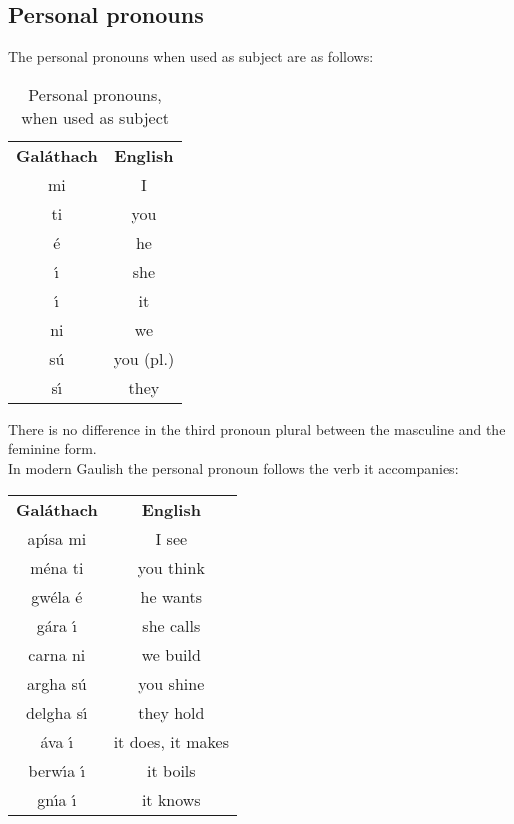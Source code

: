\subsection{Personal pronouns}

The personal pronouns when used as subject are as follows:
\begin{table}[H]
\centering
\begin{tabular}{cc}
  \toprule
  \textbf{Gal\'{a}thach} & \textbf{English}\\
  \cmidrule(lr){1-1}\cmidrule{2-2}
  mi & I \\
  ti & you\\
  \'{e} & he\\
  \'{\i} & she\\
  \'{\i} & it\\
  ni & we\\
  s\'{u} & you (pl.)\\
  s\'{\i} & they\\
  \bottomrule
\end{tabular}
\caption{Personal pronouns, when used as subject}
\label{personal_pronouns_as_subject}
\end{table}

There is no difference in the third pronoun plural between the masculine and the feminine form.\\

In modern Gaulish the personal pronoun follows the verb it accompanies:
\begin{table}[H]
\centering
\begin{tabular}{cc}
  \toprule
  \textbf{Gal\'{a}thach} & \textbf{English}\\
  \cmidrule(lr){1-1}\cmidrule{2-2}
  ap\'{\i}sa mi & I see\\
  m\'{e}na ti & you think\\
  gw\'{e}la \'{e} & he wants\\
  g\'{a}ra \'{\i} & she calls\\
  carna ni & we build\\
  argha s\'{u} & you shine\\
  delgha s\'{\i} & they hold\\
  \'{a}va \'{\i} & it  does, it makes\\
  berw\'{\i}a \'{\i} & it boils\\
  gn\'{\i}a \'{\i} & it knows\\
  \bottomrule
\end{tabular}
\label{examples_personal_pronoun}
\end{table}

